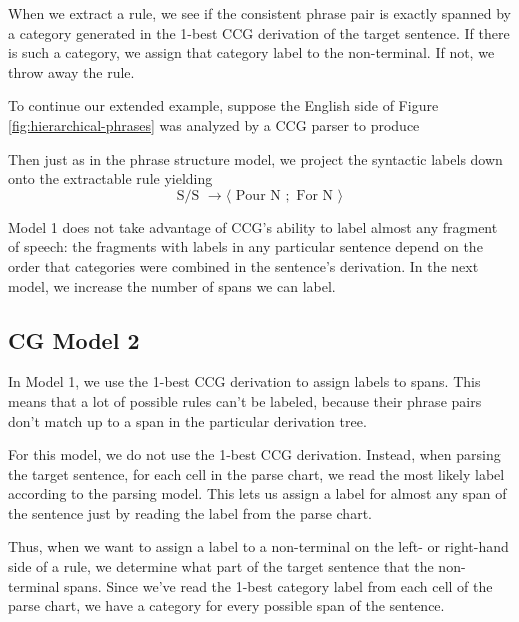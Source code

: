 \documentclass{article}
\begin{document}
When we extract a rule, we see if the consistent phrase pair is exactly spanned by a category generated in the 1-best CCG derivation of the target sentence. If there is such a category, we assign that category label to the non-terminal. If not, we throw away the rule.

To continue our extended example, suppose the English side of Figure \ref{fig:hierarchical-phrases} was analyzed by a CCG parser to produce
\begin{center}
\end{center}
Then just as in the phrase structure model, we project the syntactic labels down onto the extractable rule yielding
\begin{equation}
\textrm{S/S } \to \langle \textrm{ Pour N }; \textrm{ For N } \rangle
\end{equation}

Model 1 does not take advantage of CCG's ability to label almost any fragment of speech: the fragments with labels in any particular sentence depend on the order that categories were combined in the sentence's derivation. In the next model, we increase the number of spans we can label.

\subsection{CG Model 2}

In Model 1, we use the 1-best CCG derivation to assign labels to spans. This means that a lot of possible rules can't be labeled, because their phrase pairs don't match up to a span in the particular derivation tree.

For this model, we do not use the 1-best CCG derivation. Instead, when parsing the target sentence, for each cell in the parse chart, we read the most likely label according to the parsing model. This lets us assign a label for almost any span of the sentence just by reading the label from the parse chart.

Thus, when we want to assign a label to a non-terminal on the left- or right-hand side of a rule, we determine what part of the target sentence that the non-terminal spans. Since we've read the 1-best category label from each cell of the parse chart, we have a category for every possible span of the sentence.
\end{document}
